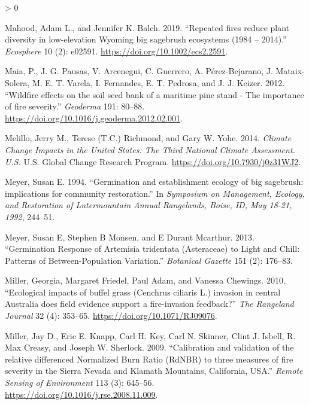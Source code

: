 \documentclass[
  12pt,
]{article}
\newlength{\cslhangindent}
\newenvironment{CSLReferences}[2] %
 {%
  \setlength{\parindent}{0pt}
  \ifodd #1 \everypar{\setlength{\hangindent}{\cslhangindent}}\ignorespaces\fi
  \ifnum #2 > 0
  \setlength{\parskip}{#2\baselineskip}
  \fi
 }%
 {}
\begin{document}
\begin{CSLReferences}{1}{0}
\leavevmode\hypertarget{ref-Mahood2019}{}%
Mahood, Adam L., and Jennifer K. Balch. 2019. {``{Repeated fires reduce
plant diversity in low-elevation Wyoming big sagebrush ecosystems (1984
-- 2014)}.''} \emph{Ecosphere} 10 (2): e02591.
\url{https://doi.org/10.1002/ecs2.2591}.

\leavevmode\hypertarget{ref-Maia2012}{}%
Maia, P., J. G. Pausas, V. Arcenegui, C. Guerrero, A. Pérez-Bejarano, J.
Mataix-Solera, M. E. T. Varela, I. Fernandes, E. T. Pedrosa, and J. J.
Keizer. 2012. {``{Wildfire effects on the soil seed bank of a maritime
pine stand - The importance of fire severity}.''} \emph{Geoderma} 191:
80--88. \url{https://doi.org/10.1016/j.geoderma.2012.02.001}.

\leavevmode\hypertarget{ref-Melillo2014}{}%
Melillo, Jerry M., Terese (T.C.) Richmond, and Gary W. Yohe. 2014.
\emph{Climate {Change} {Impacts} in the {United} {States}: {The} {Third}
{National} {Climate} {Assessment}. {U}.{S}.} U.S. Global Change Research
Program. \url{https://doi.org/10.7930/j0z31WJ2}.

\leavevmode\hypertarget{ref-Meyer1994}{}%
Meyer, Susan E. 1994. {``{Germination and establishment ecology of big
sagebrush: implications for community restoration}.''} In
\emph{Symposium on Management, Ecology, and Restoration of Lntermountain
Annual Rangelands, Boise, ID, May 18-21, 1992}, 244--51.

\leavevmode\hypertarget{ref-Meyer2013}{}%
Meyer, Susan E, Stephen B Monsen, and E Durant Mcarthur. 2013.
{``{Germination Response of Artemisia tridentata (Asteraceae) to Light
and Chill: Patterns of Between-Population Variation}.''} \emph{Botanical
Gazette} 151 (2): 176--83.

\leavevmode\hypertarget{ref-Miller2010}{}%
Miller, Georgia, Margaret Friedel, Paul Adam, and Vanessa Chewings.
2010. {``{Ecological impacts of buffel grass (Cenchrus ciliaris L.)
invasion in central Australia does field evidence support a
fire-invasion feedback?}''} \emph{The Rangeland Journal} 32 (4):
353--65. \url{https://doi.org/10.1071/RJ09076}.

\leavevmode\hypertarget{ref-Miller2009}{}%
Miller, Jay D., Eric E. Knapp, Carl H. Key, Carl N. Skinner, Clint J.
Isbell, R. Max Creasy, and Joseph W. Sherlock. 2009. {``{Calibration and
validation of the relative differenced Normalized Burn Ratio (RdNBR) to
three measures of fire severity in the Sierra Nevada and Klamath
Mountains, California, USA}.''} \emph{Remote Sensing of Environment} 113
(3): 645--56. \url{https://doi.org/10.1016/j.rse.2008.11.009}.


\end{CSLReferences}
\end{document}
